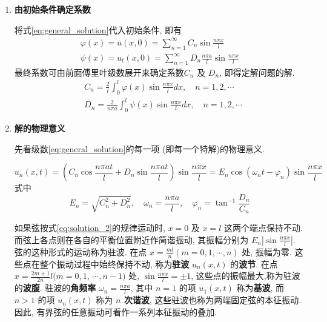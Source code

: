 \begin{solution}
\begin{enumerate}
    \item \textbf{由初始条件确定系数} 
    
        将式\eqref{eq:general_solution}代入初始条件, 即有
        $$
        \begin{gathered}
        \varphi(x)=u(x, 0)=\sum_{n=1}^{\infty} C_{n} \sin \frac{n \pi x}{l} \\
        \psi(x)=u_{t}(x, 0)=\sum_{n=1}^{\infty} D_{n} \frac{n \pi a}{l} \sin \frac{n \pi x}{l}
        \end{gathered}
        $$
        最终系数可由前面傅里叶级数展开来确定系数$C_{n}$ 及 $D_{n}$, 即得定解问题的解.
        $$
        \begin{aligned}
        & C_{n}=\frac{2}{l} \int_{0}^{l} \varphi(x) \sin \frac{n \pi x}{l} d x, \quad n=1,2, \cdots \\
        & D_{n}=\frac{2}{n \pi a} \int_{0}^{l} \psi(x) \sin \frac{n \pi x}{l} d x, \quad n=1,2, \cdots
        \end{aligned}
        $$


        \item \textbf{解的物理意义}
        
        先看级数\eqref{eq:general_solution}的每一项 (即每一个特解)的物理意义.

        \begin{equation}
            u_{n}(x, t)=\left(C_{n} \cos \frac{n \pi a t}{l}+D_{n} \sin \frac{n \pi a t}{l}\right) \sin \frac{n \pi x}{l}
            =E_{n} \cos \left(\omega_{n} t-\varphi_{n}\right) \sin \frac{n \pi x}{l}
            \label{eq:solution_2}
        \end{equation}    
        式中
        $$
        E_{n}=\sqrt{C_{n}^{2}+D_{n}^{2}}, 
            \quad \omega_{n}=\frac{n \pi a}{l}, 
            \quad \varphi_{n}=\tan ^{-1} \frac{D_{n}}{C_{n}}
        $$
        
        如果弦按式\eqref{eq:solution_2}的规律运动时, 
        $x=0$ 及 $x=l$ 这两个端点保持不动. 
        而弦上各点则在各自的平衡位置附近作简谐振动, 
        其振幅分别为 $E_{n}\left|\sin \frac{n \pi x}{l}\right|$. 
        弦的这种形式的运动称为驻波. 
        在点 $x=\frac{m l}{n}(m=0,1, \cdots, n)$ 处, 振幅为零. 
        这些点在整个振动过程中始终保持不动, 称为\textbf{驻波} $u_{n}(x, t)$ 的\textbf{波节}. 
        在点 $x=\frac{2 m+1}{2 n} l(m=0,1$, $\cdots, n-1)$ 处, 
        $\sin \frac{n \pi x}{l}= \pm 1$, 这些点的振幅最大,称为驻波的\textbf{波腹}.
         驻波的\textbf{角频率} $\omega_{n}=\frac{n \pi a}{l}$, 
         其中 $n=1$ 的项 $u_{1}(x, t)$ 称为\textbf{基波}, 
         而 $n>1$ 的项 $u_{n}(x, t)$ 称为 \textbf{$n$ 次谐波}, 
         这些驻波也称为两端固定弦的本征振动. 
         因此, 有界弦的任意振动可看作一系列本征振动的叠加.
        

\end{enumerate}
\end{solution}
